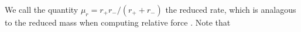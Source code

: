 We call the quantity \(\mu_r = r_+r_-/(r_+ + r_-)\) the reduced rate, which is analagous to the reduced mass when computing relative force .  Note that